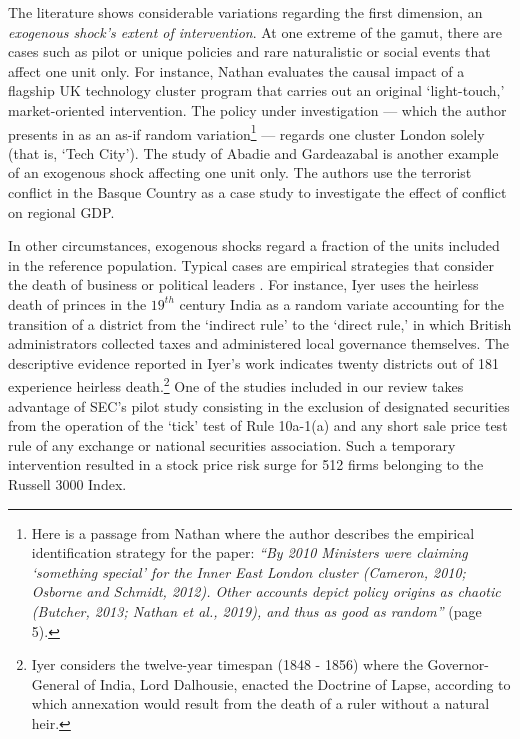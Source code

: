 \documentclass[11pt]{article}
\begin{document}
\begin{refsection}
The literature shows considerable variations regarding the first dimension, an  \textit{exogenous shock's extent of intervention}. At one extreme of the gamut, there are cases such as pilot or unique policies and rare naturalistic or social events that affect one unit only.  For instance,  Nathan \autocite*{nathan_2020} evaluates the causal impact of a flagship UK technology cluster program that carries out an original `light-touch,' market-oriented intervention. The policy under investigation --- which the author presents in as an as-if random variation\footnote{Here is a passage from Nathan  \autocite*{nathan_2020} where the author describes the empirical identification strategy for the paper: \textit{``By 2010 Ministers were claiming `something special' for the Inner East London cluster (Cameron, 2010; Osborne and Schmidt, 2012). Other accounts depict policy origins as chaotic (Butcher, 2013; Nathan et al., 2019), and thus as good as random''} (page 5).} ---  regards one cluster London solely (that is, `Tech City'). The study of Abadie and Gardeazabal \autocite*{abadie_gardeazabal_2003} is another example of an exogenous shock affecting one unit only. The authors use the terrorist conflict in the Basque Country as a case study to investigate the effect of conflict on regional GDP.

In other circumstances, exogenous shocks regard a fraction of the units included in the reference population. Typical cases are empirical strategies that consider the death of business or political leaders \autocite[e.g.,][]{iyer_2010,bennedsen_et_al_2007, nguyen_et_al_2010,nguyen_et_al_2014,johnson_et_al_1985, lee_et_al_2020,ke2019439,kang20201300,jones_olken_2005,quigley_et_al_2017, brown_et_al_2017}.  For instance, Iyer \autocite*{iyer_2010} uses the heirless death of princes in the $19^{th}$ century India as a random variate accounting for the transition of a district from the `indirect rule' to the `direct rule,' in which British administrators collected taxes and administered local governance themselves. The descriptive evidence reported in Iyer's work indicates twenty districts out of 181 experience heirless death.\footnote{Iyer considers the twelve-year timespan (1848 - 1856) where the Governor-General of India, Lord Dalhousie, enacted the Doctrine of Lapse, according to which annexation would result from the death of a ruler without a natural heir.} One of the studies included in our review \autocite{jia2020290} takes advantage of SEC's pilot study consisting in the exclusion of designated securities from the operation of the `tick' test of Rule 10a-1(a) and any short sale price test rule of any exchange or national securities association. Such a temporary intervention resulted in a stock price risk surge for 512 firms belonging to the Russell 3000 Index.


\end{refsection}
\end{document}
